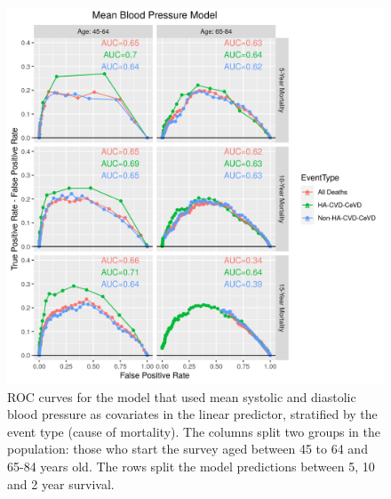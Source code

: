 \documentclass[
]{article}
\begin{document}
\begin{figure}
\hypertarget{fig:ROC_MeanBP}{%
\centering
\includegraphics{./Rmarkdown_Plots/ROC_MeanBPModel_CAx-EventType.png}
\caption{ROC curves for the model that used mean systolic and diastolic blood pressure as covariates in the linear predictor, stratified by the event type (cause of mortality). The columns split two groups in the population: those who start the survey aged between 45 to 64 and 65-84 years old. The rows split the model predictions between 5, 10 and 2 year survival.}\label{fig:ROC_MeanBP}
}
\end{figure}
\end{document}
